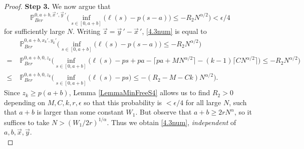 \begin{proof}
		\noindent\textbf{Step 3.} We now argue that
		\begin{equation}\label{4.3num}
		\mathbb{P}^{0, a+b, \vec{x}\,', \vec{y}\,'}_{Ber} \Big( \inf_{s\in[0,a+b]} \big(\ell(s) - p(s-a)\big) \leq -R_2 N^{\alpha/2} \Big) < \epsilon/4
		\end{equation}
		for sufficiently large $N$. Writing $\vec{z} = \vec{y}\,' - \vec{x}\,'$, \eqref{4.3num} is equal to
		\begin{align}
		& \mathbb{P}^{0, a+b, x_k', y_k'}_{Ber} \Big( \inf_{s\in[0,a+b]} \big(\ell(s) - p(s-a)\big) \leq -R_2 N^{\alpha/2} \Big) \nonumber\\
		= \; & \mathbb{P}^{0, a+b, 0, z_k}_{Ber} \Big( \inf_{s\in[0,a+b]} \big(\ell(s) - ps + pa - \lceil pa + MN^{\alpha/2}\rceil - (k-1)\lceil CN^{\alpha/2}\rceil\big) \leq -R_2 N^{\alpha/2} \Big) \nonumber\\
		\leq \; & \mathbb{P}^{0, a+b, 0, z_k}_{Ber} \Big( \inf_{s\in[0,a+b]} \big(\ell(s) - ps\big) \leq -(R_2 - M - Ck) N^{\alpha/2} \Big).\label{4.3R2}
		\end{align}
		Since $z_k\geq p(a+b)$, Lemma \ref{LemmaMinFreeS4} allows us to find $R_2>0$ depending on $M,C,k,r,\epsilon$ so that this probability is $<\epsilon/4$ for all large $N$, such that $a+b$ is larger than some constant $W_1$. But observe that $a+b \geq 2rN^\alpha$, so it suffices to take $N > (W_1/2r)^{1/\alpha}$. Thus we obtain \eqref{4.3num}, \textit{independent} of $a,b,\vec{x},\vec{y}$.\\
		

\end{proof}
